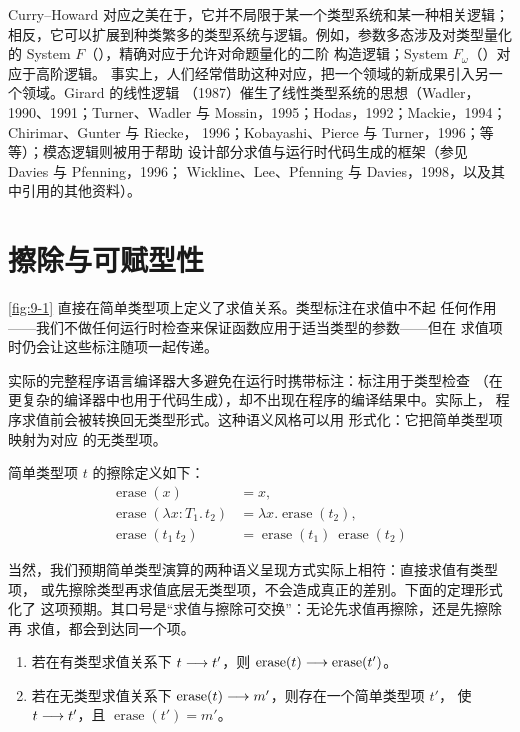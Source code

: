 Curry--Howard 对应之美在于，它并不局限于某一个类型系统和某一种相关逻辑；
相反，它可以扩展到种类繁多的类型系统与逻辑。例如，参数多态涉及对类型量化
的 System \(F\)（），精确对应于允许对命题量化的二阶
构造逻辑；System \(F_\omega\)（）对应于高阶逻辑。
事实上，人们经常借助这种对应，把一个领域的新成果引入另一个领域。Girard 的线性逻辑
（1987）催生了线性类型系统的思想（Wadler，1990、1991；Turner、Wadler 与
Mossin，1995；Hodas，1992；Mackie，1994；Chirimar、Gunter 与 Riecke，
1996；Kobayashi、Pierce 与 Turner，1996；等等）；模态逻辑则被用于帮助
设计部分求值与运行时代码生成的框架（参见 Davies 与 Pfenning，1996；
Wickline、Lee、Pfenning 与 Davies，1998，以及其中引用的其他资料）。

\section{擦除与可赋型性}
\label{sec:9.5}

\cref{fig:9-1} 直接在简单类型项上定义了求值关系。类型标注在求值中不起
任何作用——我们不做任何运行时检查来保证函数应用于适当类型的参数——但在
求值项时仍会让这些标注随项一起传递。

实际的完整程序语言编译器大多避免在运行时携带标注：标注用于类型检查
（在更复杂的编译器中也用于代码生成），却不出现在程序的编译结果中。实际上，
程序求值前会被转换回无类型形式。这种语义风格可以用
 形式化：它把简单类型项映射为对应
的无类型项。

\begin{definition}
\label{def:9.5.1}
简单类型项 \(t\) 的擦除定义如下：
\[
\begin{aligned}
\operatorname{erase}(x)
  &=x,\\
\operatorname{erase}(\lambda x:T_1.\,t_2)
  &=\lambda x.\operatorname{erase}(t_2),\\
\operatorname{erase}(t_1\,t_2)
  &=\operatorname{erase}(t_1)\ \operatorname{erase}(t_2)
\end{aligned}
\]
\end{definition}

当然，我们预期简单类型演算的两种语义呈现方式实际上相符：直接求值有类型项，
或先擦除类型再求值底层无类型项，不会造成真正的差别。下面的定理形式化了
这项预期。其口号是“求值与擦除可交换”：无论先求值再擦除，还是先擦除再
求值，都会到达同一个项。

\taplstatementliststart
\begin{theorem}
\label{thm:9.5.2}
\taplstatementlistbreak
\begin{enumerate}
  \item 若在有类型求值关系下 \(t\mathrel{\longrightarrow} t'\)，则
    \(\operatorname{erase}(t)\mathrel{\longrightarrow}\operatorname{erase}(t')\)。
  \item 若在无类型求值关系下
    \(\operatorname{erase}(t)\mathrel{\longrightarrow} m'\)，则存在一个简单类型项 \(t'\)，
    使 \(t\mathrel{\longrightarrow} t'\)，且 \(\operatorname{erase}(t')=m'\)。
\end{enumerate}
\end{theorem}

